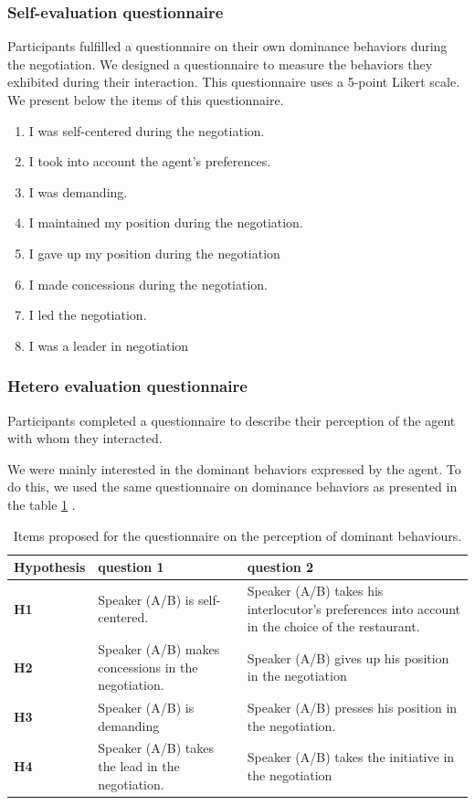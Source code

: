 \documentclass[10pt, a4paper]{article} %
\begin{document}
	\subsubsection{Self-evaluation questionnaire}
	 Participants fulfilled a questionnaire on their own dominance behaviors during the negotiation. We designed a questionnaire to measure the behaviors they exhibited during their interaction. This questionnaire uses a 5-point Likert scale. We present below the items of this questionnaire. 
	 \begin{enumerate}
		 \item I was self-centered during the negotiation.
		 \item I took into account the agent's preferences.
		 \item I was demanding.
		 \item I maintained my position during the negotiation.
		 \item I gave up my position during the negotiation
		 \item I made concessions during the negotiation.	
		 \item I led the negotiation.
		 \item I was a leader in negotiation
	\end{enumerate}
	
	\subsubsection{Hetero evaluation questionnaire}
		Participants completed a questionnaire to describe their perception of the agent with whom they interacted.
		
		We were mainly interested in the dominant behaviors expressed by the agent. To do this, we used the same questionnaire on dominance behaviors as presented in the table \ref{table:questionnaire} .
					\begin{table}[b]
						\centering
						\begin{tabular}{|p{1.75cm}|p{4cm}|p{4.8cm}|}
							
							\hline
							Hypothesis &question 1& question 2 \\
							\hline
							\textbf{H1} &Speaker (A/B) is self-centered.&Speaker (A/B) takes his interlocutor's preferences into account in the choice of the restaurant.\\
							\hline
							\textbf{H2} &Speaker (A/B) makes concessions in the negotiation.&Speaker (A/B) gives up his position in the negotiation\\
							\hline
							\textbf{H3} & Speaker (A/B) is demanding&Speaker (A/B) presses his position in the negotiation. \\
							\hline
							\textbf{H4} &Speaker (A/B) takes the lead in the negotiation.&Speaker (A/B) takes the initiative in the negotiation \\
							\hline
						\end{tabular}
						
						\caption{Items proposed for the questionnaire on the perception of dominant behaviours.}
						\label{table:questionnaire}
					\end{table}
					
\end{document}
